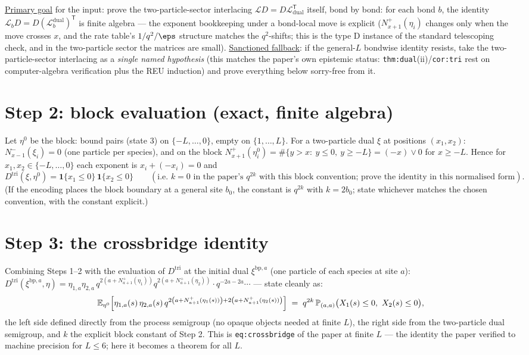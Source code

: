 \documentclass[11pt]{article}
\theoremstyle{plain}
\theoremstyle{remark}
\newcommand{\bone}{\mathbf 1}
\begin{document}
\underline{Primary goal} for the input: prove the two-particle-sector interlacing
$\mathcal L D=D\mathcal L_{\mathrm{dual}}^{\mathsf T}$ itself, bond by bond: for each
bond $b$, the identity $\mathcal L_b D=D(\mathcal L^{\mathrm{dual}}_b)^{\mathsf T}$
is finite algebra --- the exponent bookkeeping under a bond-local move is explicit
($N^+_{x+1}(\eta_i)$ changes only when the move crosses $x$, and the rate table's
$1/q^2/\eps$ structure matches the $q^{2}$-shifts; this is the type D instance of
the standard telescoping check, and in the two-particle sector the matrices are
small). \underline{Sanctioned fallback}: if the general-$L$ bondwise identity resists,
take the two-particle-sector interlacing as a \emph{single named hypothesis} (this
matches the paper's own epistemic status: \texttt{thm:dual}(ii)/\texttt{cor:tri}
rest on computer-algebra verification plus the REU induction) and prove everything
below sorry-free from it.

\section*{Step 2: block evaluation (exact, finite algebra)}

Let $\eta^0$ be the block: bound pairs (state $3$) on $\{-L,\dots,0\}$, empty on
$\{1,\dots,L\}$. For a two-particle dual $\xi$ at positions $(x_1,x_2)$:
$N^-_{x-1}(\xi_i)=0$ (one particle per species), and on the block
$N^+_{x+1}(\eta^0_i)=\#\{y>x:\ y\le0,\ y\ge-L\}=(-x)\vee0$ for $x\ge-L$. Hence for
$x_1,x_2\in\{-L,\dots,0\}$ each exponent is $x_i+(-x_i)=0$ and
\[
  D^{\mathrm{tri}}(\xi,\eta^0)=\bone\{x_1\le0\}\,\bone\{x_2\le0\}
  \qquad(\text{i.e.\ }k=0\text{ in the paper's }q^{2k}\text{ with this block
  convention; prove the identity in this normalised form}).
\]
(If the encoding places the block boundary at a general site $b_0$, the constant is
$q^{2k}$ with $k=2b_0$; state whichever matches the chosen convention, with the
constant explicit.)

\section*{Step 3: the crossbridge identity}

Combining Steps 1--2 with the evaluation of $D^{\mathrm{tri}}$ at the initial dual
$\xi^{\mathrm{bp},a}$ (one particle of each species at site $a$):
$D^{\mathrm{tri}}(\xi^{\mathrm{bp},a},\eta)
=\eta_{1,a}\eta_{2,a}\,q^{2\left(a+N^+_{a+1}(\eta_1)\right)}
q^{2\left(a+N^+_{a+1}(\eta_2)\right)}\cdot q^{-2a-2a}\cdots$ --- state cleanly as:
\begin{equation}\label{eq:cb}
  \E_{\eta^0}\Big[\eta_{1,a}(s)\,\eta_{2,a}(s)\,
  q^{2\left(a+N^+_{a+1}(\eta_1(s))\right)+2\left(a+N^+_{a+1}(\eta_2(s))\right)}\Big]
  \;=\;q^{2k}\,\mathbb P_{(a,a)}\big(X_1(s)\le0,\ X_2(s)\le0\big),
\end{equation}
the left side defined directly from the process semigroup (no opaque objects
needed at finite $L$), the right side from the two-particle dual semigroup, and
$k$ the explicit block constant of Step 2. This is
\texttt{eq:crossbridge} of the paper at finite $L$ --- the identity the paper
verified to machine precision for $L\le6$; here it becomes a theorem for all $L$.
\end{document}
